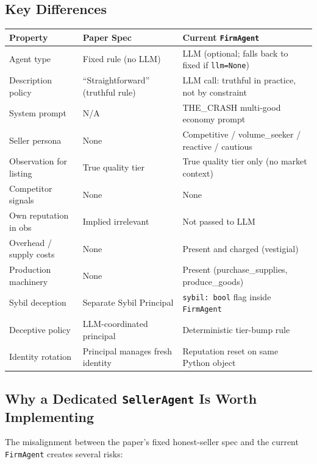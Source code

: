 \documentclass{article}
\begin{document}
\subsection{Key Differences}

\begin{center}
\begin{tabular}{lll}
\hline
\textbf{Property} & \textbf{Paper Spec} & \textbf{Current \texttt{FirmAgent}} \\
\hline
Agent type & Fixed rule (no LLM) & LLM (optional; falls back to fixed if \texttt{llm=None}) \\
Description policy & ``Straightforward'' (truthful rule) & LLM call: truthful in practice, not by constraint \\
System prompt & N/A & THE\_CRASH multi-good economy prompt \\
Seller persona & None & Competitive / volume\_seeker / reactive / cautious \\
Observation for listing & True quality tier & True quality tier only (no market context) \\
Competitor signals & None & None \\
Own reputation in obs & Implied irrelevant & Not passed to LLM \\
Overhead / supply costs & None & Present and charged (vestigial) \\
Production machinery & None & Present (purchase\_supplies, produce\_goods) \\
Sybil deception & Separate Sybil Principal & \texttt{sybil: bool} flag inside \texttt{FirmAgent} \\
Deceptive policy & LLM-coordinated principal & Deterministic tier-bump rule \\
Identity rotation & Principal manages fresh identity & Reputation reset on same Python object \\
\hline
\end{tabular}
\end{center}

\subsection{Why a Dedicated \texttt{SellerAgent} Is Worth Implementing}

The misalignment between the paper's fixed honest-seller spec and the current
\texttt{FirmAgent} creates several risks:
\end{document}
